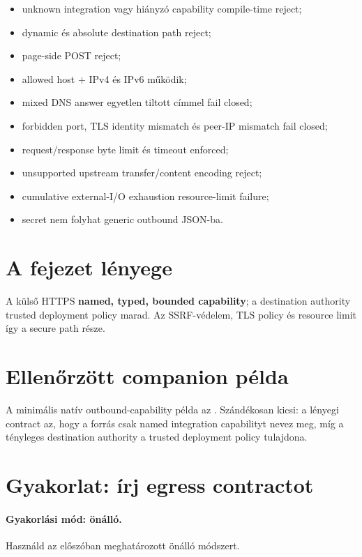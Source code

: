 \begin{itemize}
  \item unknown integration vagy hiányzó  capability compile-time reject;
  \item dynamic és absolute destination path reject;
  \item page-side POST reject;
  \item allowed host + IPv4 és IPv6 működik;
  \item mixed DNS answer egyetlen tiltott címmel fail closed;
  \item forbidden port, TLS identity mismatch és peer-IP mismatch fail closed;
  \item request/response byte limit és timeout enforced;
  \item unsupported upstream transfer/content encoding reject;
  \item cumulative external-I/O exhaustion resource-limit failure;
  \item secret nem folyhat generic outbound JSON-ba.
\end{itemize}

\section{A fejezet lényege}

A külső HTTPS \textbf{named, typed, bounded capability}; a destination authority trusted deployment policy marad. Az SSRF-védelem, TLS policy és resource limit így a secure path része.

\section{Ellenőrzött companion példa}
A minimális natív outbound-capability példa az . Szándékosan kicsi: a lényegi contract az, hogy a forrás csak named integration capabilityt nevez meg, míg a tényleges destination authority a trusted deployment policy tulajdona.

\section{Gyakorlat: írj egress contractot}
\paragraph{Gyakorlási mód: önálló.} Használd az előszóban meghatározott önálló módszert.

